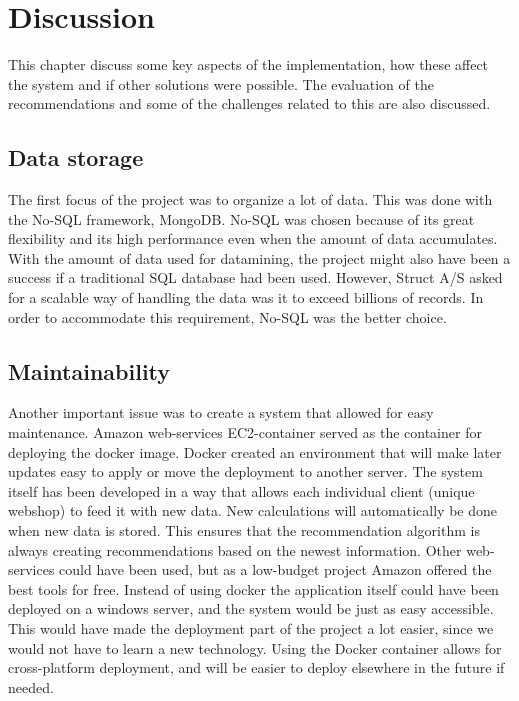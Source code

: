 
\chapter{Discussion} %

\label{Chapter7} %

This chapter discuss some key aspects of the implementation, how these affect the system and if other solutions were possible. The evaluation of the recommendations and some of the challenges related to this are also discussed.

\section{Data storage}
The first focus of the project was to organize a lot of data. This was done with the No-SQL framework, MongoDB. No-SQL was chosen because of its great flexibility and its high performance even when the amount of data accumulates. With the amount of data used for datamining, the project might also have been a success if a traditional SQL database had been used. However, Struct A/S asked for a scalable way of handling the data was it to exceed billions of records. In order to accommodate this requirement, No-SQL was the better choice.

\section{Maintainability}
Another important issue was to create a system that allowed for easy maintenance. Amazon web-services EC2-container served as the container for deploying the docker image. Docker created an environment that will make later updates easy to apply or move the deployment to another server. The system itself has been developed in a way that allows each individual client (unique webshop) to feed it with new data. New calculations will automatically be done when new data is stored. This ensures that the recommendation algorithm is always creating recommendations based on the newest information. Other web-services could have been used, but as a low-budget project Amazon offered the best tools for free.
Instead of using docker the application itself could have been deployed on a windows server, and the system would be just as easy accessible. This would have made the deployment part of the project a lot easier, since we would not have to learn a new technology. Using the Docker container allows for cross-platform deployment, and will be easier to deploy elsewhere in the future if needed.

